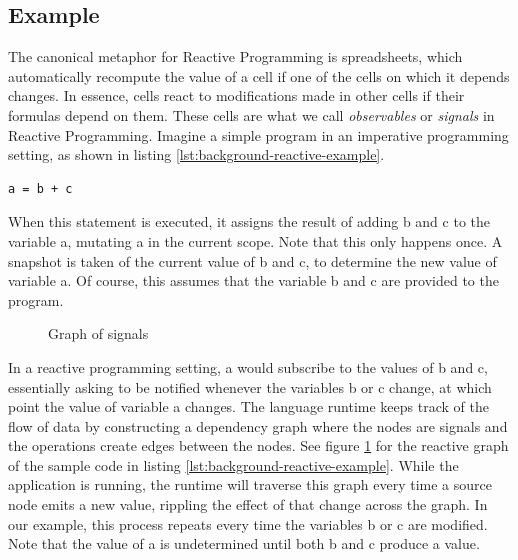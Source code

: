 \subsection{Example}

The canonical metaphor for Reactive Programming is spreadsheets, which automatically recompute the value of a cell if one of the cells on which it depends changes. In essence, cells react to modifications made in other cells if their formulas depend on them. These cells are what we call \textit{observables} or \textit{signals} in Reactive Programming.
Imagine a simple program in an imperative programming setting, as shown in listing \ref{lst:background-reactive-example}.

\begin{lstlisting}[caption={A basic reactive program},captionpos=b,label={lst:background-reactive-example}]
	a = b + c
\end{lstlisting}

When this statement is executed, it assigns the result of adding b and c to the variable a, mutating a in the current scope. Note that this only happens once. A snapshot is taken of the current value of b and c, to determine the new value of variable a. Of course, this assumes that the variable b and c are provided to the program.

\begin{figure}[h]
	\caption{Graph of signals}
	\label{fig:background-reactive-example}
\end{figure}

In a reactive programming setting, a would subscribe to the values of b and c, essentially asking to be notified whenever the variables b or c change, at which point the value of variable a changes. The language runtime keeps track of the flow of data by constructing a dependency graph where the nodes are signals and the operations create edges between the nodes. See figure \ref{fig:background-reactive-example} for the reactive graph of the sample code in listing \ref{lst:background-reactive-example}. While the application is running, the runtime will traverse this graph every time a source node emits a new value, rippling the effect of that change across the graph.  In our example, this process repeats every time the variables b or c are modified. Note that the value of a is undetermined until both b and c produce a value. 

